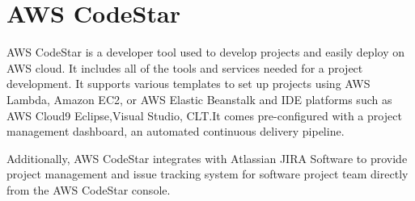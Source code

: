 \section{AWS CodeStar}

AWS CodeStar is a developer tool used to develop projects and easily deploy on 
AWS cloud\cite{hid-sp18-602-www-awscodestar-blog}. It includes all of the tools and services needed
for a project development. It supports various templates to set up projects using AWS Lambda, 
Amazon EC2, or AWS Elastic Beanstalk and IDE platforms such as AWS Cloud9 Eclipse,Visual Studio,
CLT.It comes pre-configured with a project management dashboard, an automated continuous 
delivery pipeline.  

Additionally, AWS CodeStar integrates with Atlassian JIRA Software to 
provide project management and issue tracking system for software project 
team directly from the AWS CodeStar console\cite{hid-sp18-602-www-awscodestar-blog}.

